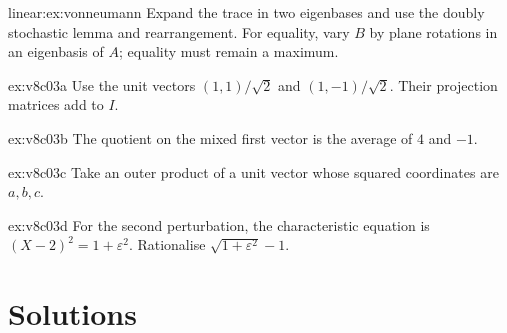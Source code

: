 \begin{hint}{linear:ex:vonneumann}
Expand the trace in two eigenbases and use the doubly stochastic lemma and rearrangement. For equality, vary $B$ by plane rotations in an eigenbasis of $A$; equality must remain a maximum.
\end{hint}
\begin{hint}{ex:v8c03a}
Use the unit vectors $(1,1)/\sqrt2$ and $(1,-1)/\sqrt2$. Their projection matrices add to $I$.
\end{hint}
\begin{hint}{ex:v8c03b}
The quotient on the mixed first vector is the average of $4$ and $-1$.
\end{hint}
\begin{hint}{ex:v8c03c}
Take an outer product of a unit vector whose squared coordinates are $a,b,c$.
\end{hint}
\begin{hint}{ex:v8c03d}
For the second perturbation, the characteristic equation is $(X-2)^2=1+\varepsilon^2$. Rationalise $\sqrt{1+\varepsilon^2}-1$.
\end{hint}

\section{Solutions}

